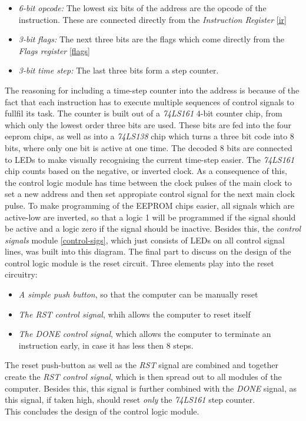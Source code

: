 \begin{itemize}
  \item \emph{6-bit opcode: } The lowest six bits of the address are the opcode of the
  instruction. These are connected directly from the \emph{Instruction Register} \ref{ir}
  \item \emph{3-bit flags: } The next three bits are the flags which come directly from the
  \emph{Flags register} \ref{flags}
  \item \emph{3-bit time step: } The last three bits form a step counter.
\end{itemize}
The reasoning for including a time-step counter into the address is because of the fact that
each instruction has to execute multiple sequences of control signals to fullfil its task. The
counter is built out of a \emph{74LS161} \cite{74ls161} 4-bit counter chip, from which only the
lowest order three bits are used. These bits are fed into the four eeprom chips, as well as
into a \emph{74LS138} \cite{74ls138}  chip which turns a three bit code into 8 bits, where only
one bit is active at one time. The decoded 8 bits are connected to LEDs to make visually
recognising the current time-step easier. The \emph{74LS161} \cite{74ls161} chip counts based on
the negative, or inverted clock. As a consequence of this, the control logic module has time
between the clock pulses of the main clock to set a new address and then set appropiate control
signal for the next main clock pulse. To make programming of the EEPROM chips easier, all signals
which are active-low are inverted, so that a logic 1 will be programmed if the signal should be
active and a logic zero if the signal should be inactive. Besides this, the \emph{control
signals} module \ref{control-sigs}, which just consists of LEDs on all control signal lines, was
built into this diagram. The final part to discuss on the design of the control logic module is
the reset circuit. Three elements play into the reset circuitry:
\begin{itemize}
  \item \emph{A simple push button}, so that the computer can be manually reset
  \item \emph{The RST control signal}, whih allows the computer to reset itself
  \item \emph{The DONE control signal}, which allows the computer to terminate an instruction
  early, in case it has less then 8 steps.
\end{itemize}
The reset push-button as well as the \emph{RST} signal are combined and together create the
\emph{RST control signal}, which is then spread out to all modules of the computer. Besides this,
this signal is further combined with the \emph{DONE} signal, as this signal, if taken high, should
reset \emph{only} the \emph{74LS161} step counter. \\
This concludes the design of the control logic module.


